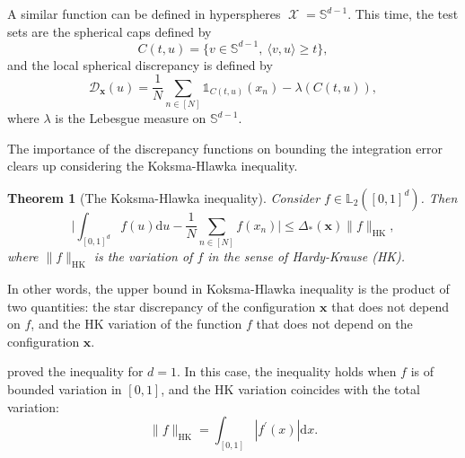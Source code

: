 \documentclass[twoside,11pt]{book}
\newtheorem{theorem}{Theorem}
\DeclareMathOperator{\X}{\mathcal{X}}
\begin{document}
A similar function can be defined in hyperspheres $\X = \mathbb{S}^{d-1}$. This time, the test sets are the spherical caps defined by
\begin{equation}
C(t,u) = \{ v \in \mathbb{S}^{d-1}, \: \langle v, u \rangle \geq t\},
\end{equation}
and the local spherical discrepancy is defined by
\begin{equation}
\mathcal{D}_{\bm{x}}(u) = \frac{1}{N}\sum\limits_{n \in [N]} \mathbb{1}_{C(t,u)}(x_n) - \lambda(C(t,u)),
\end{equation}
where $\lambda$ is the Lebesgue measure on $\mathbb{S}^{d-1}$.


The importance of the discrepancy functions on bounding the integration error clears up considering the Koksma-Hlawka inequality.


\begin{theorem}[The Koksma-Hlawka inequality]\label{thm:KH_ineq}
Consider $f \in \mathbb{L}_{2}([0,1]^{d})$. Then 
\begin{equation}\label{eq:KH_ineq}
\bigg| \int_{[0,1]^{d}} f(u) \mathrm{d}u - \frac{1}{N} \sum\limits_{n \in [N]}  f(x_{n})\bigg| \leq \Delta_{*}(\bm{x}) \|f\|_{\mathrm{HK}},
\end{equation}
where $\|f\|_{\mathrm{HK}}$ is the variation of $f$ in the sense of Hardy-Krause (HK). 


\end{theorem}

In other words, the upper bound in Koksma-Hlawka inequality is the product of two quantities: the star discrepancy of the configuration $\bm{x}$ that does not depend on $f$, and the HK variation of the function $f$ that does not depend on the configuration $\bm{x}$. 

\cite{Kok42} proved the inequality for $d=1$. In this case, the inequality holds when $f$ is of bounded variation in $[0,1]$, and the HK variation coincides with the total variation:
\begin{equation}
\|f\|_{\mathrm{HK}} = \int_{[0,1]}|f^{'}(x)| \mathrm{d}x.
\end{equation}
\end{document}
